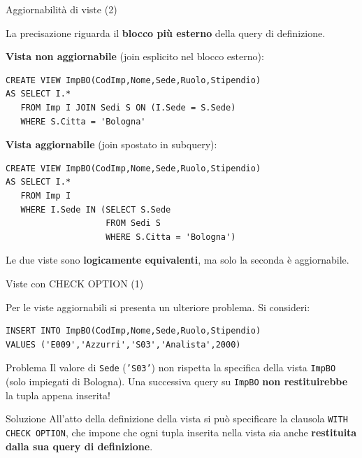 \documentclass[aspectratio=169]{beamer}
\begin{document}
\begin{frame}[fragile]{Aggiornabilità di viste (2)}

La precisazione riguarda il \textbf{blocco più esterno} della query di definizione.

\vspace{6pt}
\textbf{Vista non aggiornabile} (join esplicito nel blocco esterno):
\begin{lstlisting}
CREATE VIEW ImpBO(CodImp,Nome,Sede,Ruolo,Stipendio)
AS SELECT I.*
   FROM Imp I JOIN Sedi S ON (I.Sede = S.Sede)
   WHERE S.Citta = 'Bologna'
\end{lstlisting}

\vspace{4pt}
\textbf{Vista aggiornabile} (join spostato in subquery):
\begin{lstlisting}
CREATE VIEW ImpBO(CodImp,Nome,Sede,Ruolo,Stipendio)
AS SELECT I.*
   FROM Imp I
   WHERE I.Sede IN (SELECT S.Sede
                    FROM Sedi S
                    WHERE S.Citta = 'Bologna')
\end{lstlisting}

\vspace{2pt}
Le due viste sono \textbf{logicamente equivalenti}, ma solo la seconda è aggiornabile.

\end{frame}

\begin{frame}[fragile]{Viste con CHECK OPTION (1)}

Per le viste aggiornabili si presenta un ulteriore problema. Si consideri:

\begin{lstlisting}
INSERT INTO ImpBO(CodImp,Nome,Sede,Ruolo,Stipendio)
VALUES ('E009','Azzurri','S03','Analista',2000)
\end{lstlisting}

\begin{alertblock}{Problema}
Il valore di \texttt{Sede} (\texttt{'S03'}) \alert{non rispetta} la specifica della vista \texttt{ImpBO} (solo impiegati di Bologna).
Una successiva query su \texttt{ImpBO} \textbf{non restituirebbe} la tupla appena inserita!
\end{alertblock}

\vspace{8pt}
\begin{block}{Soluzione}
All'atto della definizione della vista si può specificare la clausola \texttt{WITH CHECK OPTION}, che impone che ogni tupla inserita nella vista sia anche \textbf{restituita dalla sua query di definizione}.
\end{block}

\end{frame}
\end{document}
